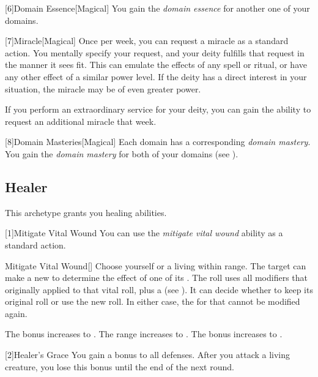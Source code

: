         [6]{Domain Essence}[Magical]
        You gain the \textit{domain essence} for another one of your domains.

        [7]{Miracle}[Magical]
        Once per week, you can request a miracle as a standard action.
        You mentally specify your request, and your deity fulfills that request in the manner it sees fit.
        This can emulate the effects of any spell or ritual, or have any other effect of a similar power level.
        If the deity has a direct interest in your situation, the miracle may be of even greater power.

        If you perform an extraordinary service for your deity, you can gain the ability to request an additional miracle that week.

        [8]{Domain Masteries}[Magical]
        Each domain has a corresponding \textit{domain mastery}.
        You gain the \textit{domain mastery} for both of your domains (see ).

    \subsection{Healer}
        This archetype grants you healing abilities.

        [1]{Mitigate Vital Wound} You can use the \textit{mitigate vital wound} ability as a standard action.
        \begin{freeability}{Mitigate Vital Wound}[]
            Choose yourself or a living  within \rngmed range.
            The target can make a new  to determine the effect of one of its .
            The roll uses all modifiers that originally applied to that vital roll, plus a   (see ).
            It can decide whether to keep its original roll or use the new roll.
            In either case, the  for that  cannot be modified again.

            \rankline
             The bonus increases to .
             The range increases to \rnglong.
             The bonus increases to .
        \end{freeability}

        [2]{Healer's Grace} You gain a  bonus to all defenses.
        After you attack a living creature, you lose this bonus until the end of the next round.


